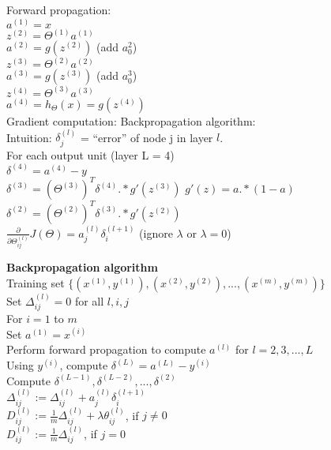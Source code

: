 \documentclass{article}
\newcommand\tab[1][1cm]{\hspace*{#1}}
\begin{document}
Forward propagation: \\
$a^{(1)} = x$\\
$z^{(2)} = \Theta^{(1)}a^{(1)}$\\
$a^{(2)} = g(z^{(2)})$ (add $a_0^{2}$)\\
$z^{(3)} = \Theta^{(2)}a^{(2)}$\\
$a^{(3)} = g(z^{(3)})$ (add $a_0^{3}$)\\
$z^{(4)} = \Theta^{(3)}a^{(3)}$\\
$a^{(4)} = h_\Theta(x) = g(z^{(4)})$\\

Gradient computation: Backpropagation algorithm: \\
Intuition: $\delta_j^{(l)}$ = ``error'' of node j in layer $l$.\\

For each output unit (layer L = 4) \\
$\delta^{(4)} = a^{(4)} - y$ \\
$\delta^{(3)} = (\Theta^{(3)})^T \delta^{(4)} .* g'(z^{(3)})$ \tab $g'(z) = a .* (1-a)$ \\
$\delta^{(2)} = (\Theta^{(2)})^T \delta^{(3)} .* g'(z^{(2)})$ \\

$\frac{\partial}{\partial \Theta_{ij}^{(l)}}J(\Theta) = a_j^{(l)} \delta_i^{(l+1)}$ (ignore $\lambda$ or $\lambda = 0$)\\

\newpage

\textbf{Backpropagation algorithm}\\
Training set $\{(x^{(1)}, y^{(1)}),(x^{(2)}, y^{(2)}),...,(x^{(m)}, y^{(m)})\}$ \\
Set $\Delta_{ij}^{(l)} = 0$ for all $l, i, j$ \\
For $i = 1$ to $m$ \\
\tab Set $a^{(1)} = x^{(i)}$ \\
\tab Perform forward propagation to compute $a^{(l)}$ for $l = 2, 3, ..., L$ \\
\tab Using $y^{(i)}$, compute $\delta^{(L)} = a^{(L)} - y^{(i)}$ \\
\tab Compute $\delta^{(L-1)}, \delta^{(L-2)}, ..., \delta^{(2)}$ \\
\tab $\Delta_{ij}^{(l)} := \Delta_{ij}^{(l)} + a_j^{(l)} \delta_i^{(l+1)}$ \\

$D_{ij}^{(l)} := \frac{1}{m} \Delta_{ij}^{(l)} + \lambda \theta_{ij}^{(l)}$, if $j \ne 0$ \\
$D_{ij}^{(l)} := \frac{1}{m} \Delta_{ij}^{(l)}$, \tab if $j = 0$ \\
\end{document}
